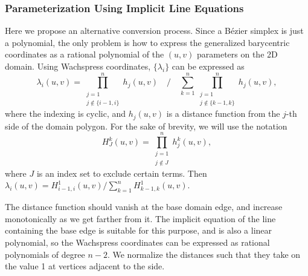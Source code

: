 \documentclass[9pt,academicons]{article}
\begin{document}
\subsubsection{Parameterization Using Implicit Line Equations}
\label{subsubsec:parameters}
Here we propose an alternative conversion process. Since a B\'ezier simplex is just a polynomial,
the only problem is how to express the generalized barycentric coordinates as a rational polynomial
of the $(u,v)$ parameters on the 2D domain. Using Wachspress coordinates,
$\{\lambda_i\}$ can be expressed as
\begin{equation}
  \label{eq:wachspress}
  \lambda_i(u,v) = \prod_{\substack{j=1\\j\notin\{i-1,i\}}}^nh_j(u,v) \quad\bigg/\quad
                   \sum_{k=1}^n\prod_{\substack{j=1\\j\notin\{k-1,k\}}}^nh_j(u,v),
\end{equation}
where the indexing is cyclic, and $h_j(u,v)$ is a distance function
from the $j$-th side of the domain polygon. For the sake of brevity,
we will use the notation
\begin{equation}
  \label{eq:prod-h}
  H_J^k(u,v)=\prod_{\substack{j=1\\j\notin{J}}}^nh_j^k(u,v),
\end{equation}
where $J$ is an index set to exclude certain terms.
Then $\lambda_i(u,v)=H_{i-1,i}^1(u,v)/\sum_{k=1}^nH_{k-1,k}^1(u,v)$.

The distance function should vanish at the base domain edge, and increase monotonically
as we get farther from it.
The implicit
equation of the line containing the base edge is suitable for this purpose,
and is also a linear polynomial,
so the Wachspress coordinates can be expressed as rational polynomials of degree $n-2$. We
normalize the distances such that they take on the value 1 at vertices adjacent to the side.
\end{document}
